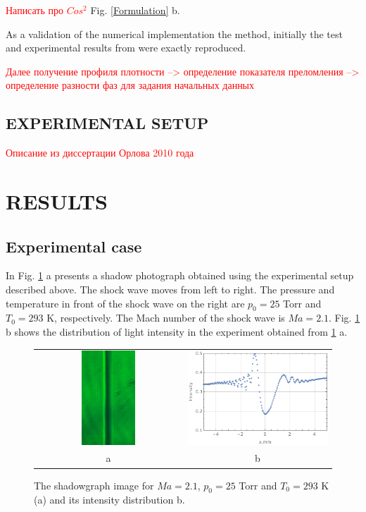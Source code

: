 \documentclass{aip-cp}
\begin{document}
\textcolor{red}{Написать про $Cos^2$} Fig. \ref{Formulation} b.

As a validation of the numerical implementation the method, initially the test and experimental results from \cite{Pfeifer} were exactly reproduced.


\textcolor{red}{Далее получение профиля плотности --> определение показателя преломления --> определение разности фаз для задания начальных данных}

\subsection{EXPERIMENTAL SETUP}

\textcolor{red}{Описание из диссертации Орлова 2010 года}

\section{RESULTS}

\subsection{Experimental case}

In Fig. \ref{Experiment_Ma2p1} a presents a shadow photograph obtained using the experimental setup described above. The shock wave moves from left to right. The pressure and temperature in front of the shock wave on the right are $p_0=25$ Torr and $T_0=293$ K, respectively. The Mach number of the shock wave is $Ma=2.1$. Fig. \ref{Experiment_Ma2p1} b shows the distribution of light intensity in the experiment obtained from \ref{Experiment_Ma2p1} a.

\begin{figure}
\begin{tabular}{cc}
    {\includegraphics[width=185pt, height=100pt]{figures/Experiment_Ma2p1_foto.jpg}}
    &{\includegraphics[width=185pt,height=100pt]{figures/2b.png}}\\ a&b
\end{tabular}
\caption{The shadowgraph image for $Ma=2.1$, $p_0=25$ Torr and $T_0=293$ K (a) and its intensity distribution {b}.}
\label{Experiment_Ma2p1}
\end{figure}
\end{document}
